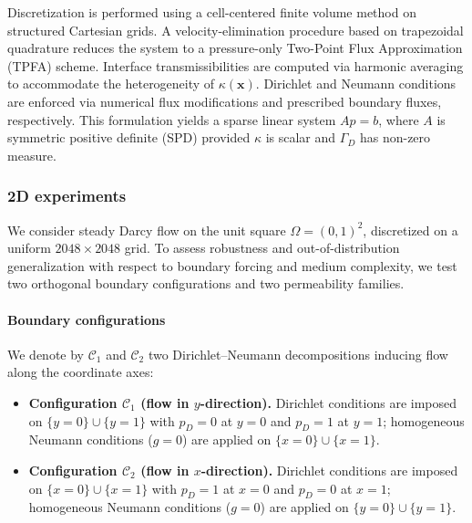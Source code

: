 \documentclass{article}
\theoremstyle{definition}
\theoremstyle{remark}
\begin{document}
Discretization is performed using a cell-centered finite volume method on structured Cartesian grids. 
A velocity-elimination procedure based on trapezoidal quadrature \cite{vet} reduces the system to a pressure-only Two-Point Flux Approximation (TPFA) scheme. 
Interface transmissibilities are computed via harmonic averaging to accommodate the heterogeneity of $\kappa(\bm{x})$. 
Dirichlet and Neumann conditions are enforced via numerical flux modifications and prescribed boundary fluxes, respectively. 
This formulation yields a sparse linear system $Ap=b$, where $A$ is symmetric positive definite (SPD) provided $\kappa$ is scalar and $\Gamma_D$ has non-zero measure.

\subsubsection{2D experiments}
\label{subsubsec:2d}

We consider steady Darcy flow on the unit square \(\Omega=(0,1)^2\), discretized on a uniform \(2048\times 2048\) grid. 
To assess robustness and out-of-distribution generalization with respect to boundary forcing and medium complexity, we test two orthogonal boundary configurations and two permeability families.

\paragraph{Boundary configurations}
We denote by \(\mathcal{C}_1\) and \(\mathcal{C}_2\) two Dirichlet--Neumann decompositions inducing flow along the coordinate axes:
\begin{itemize}
  \item \textbf{Configuration \(\mathcal{C}_1\) (flow in \(y\)-direction).}
  Dirichlet conditions are imposed on \(\{y=0\}\cup\{y=1\}\) with \(p_D=0\) at \(y=0\) and \(p_D=1\) at \(y=1\); homogeneous Neumann conditions (\(g=0\)) are applied on \(\{x=0\}\cup\{x=1\}\).
  \item \textbf{Configuration \(\mathcal{C}_2\) (flow in \(x\)-direction).}
  Dirichlet conditions are imposed on \(\{x=0\}\cup\{x=1\}\) with \(p_D=1\) at \(x=0\) and \(p_D=0\) at \(x=1\); homogeneous Neumann conditions (\(g=0\)) are applied on \(\{y=0\}\cup\{y=1\}\).
\end{itemize}
\end{document}
